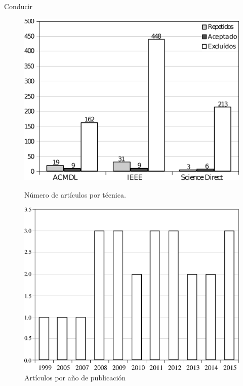 \begin{frame}		
	\begin{block}{Conducir}
		\begin{figure}
			\tiny
			\begin{minipage}[b]{0.46\textwidth}
				\includegraphics[width=\textwidth]{./secoes/RevisaoDaLiteratura/GraficoQuantidade.eps}
				\caption{Número de artículos por técnica.}
			\end{minipage}
		     \hspace{0.1cm}
			\begin{minipage}[b]{0.46\textwidth}
				\includegraphics[width=\textwidth]{./secoes/RevisaoDaLiteratura/GraficoQuantidadeAno.eps}
				\caption{Artículos por año de publicación}
			\end{minipage}
		\end{figure}
		
	\end{block}
\end{frame}

